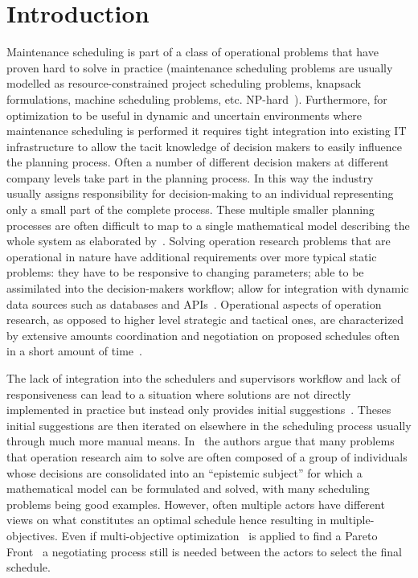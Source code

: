 \section{Introduction}
Maintenance scheduling is part of a class of operational problems that
have proven hard to solve in practice (maintenance scheduling problems are usually modelled as
resource-constrained project scheduling problems, knapsack formulations,
machine scheduling problems, etc. NP-hard~\citep{garey1979computers}).
Furthermore, for optimization to be useful in dynamic and uncertain environments
where maintenance scheduling is performed it requires tight integration into
existing IT infrastructure to allow the tacit knowledge of decision makers to
easily influence the planning process. Often a number of different decision
makers at different company levels take part in the planning process. In
this way the industry usually assigns responsibility for decision-making
to an individual representing only a small part of the complete process.
These multiple smaller planning processes are often difficult to map to
a single mathematical model describing the whole system as elaborated
by~\citep{barthelemy2002human}. Solving operation research problems that
are operational in nature have additional requirements over more typical
static problems: they have to be responsive to changing parameters; able to
be assimilated into the decision-makers workflow; allow for integration with
dynamic data sources such as databases and APIs~\citep{meignan_review_2015}.
Operational aspects of operation research, as opposed to higher level
strategic and tactical ones, are characterized by extensive amounts
coordination and negotiation on proposed schedules often in a short amount of
time~\citep{palmerMaintenancePlanningScheduling2019}.

The lack of integration into the schedulers and supervisors workflow
and lack of responsiveness can lead to a situation where solutions are
not directly implemented in practice but instead only provides initial
suggestions~\citep{meignan_review_2015}. Theses initial suggestions are then
iterated on elsewhere in the scheduling process usually through much more manual
means. In~\citep{barthelemy2002human} the authors argue that many problems that
operation research aim to solve are often composed of a group of individuals
whose decisions are consolidated into an ``epistemic subject'' for which a
mathematical model can be formulated and solved, with many scheduling problems
being good examples. However, often multiple actors have different views on what
constitutes an optimal schedule hence resulting in multiple-objectives. Even if
multi-objective optimization~\citep{ehrgott2002multiple} is applied to find a
Pareto Front~\citep{Pareto1897} a negotiating process still is needed between
the actors to select the final schedule.

